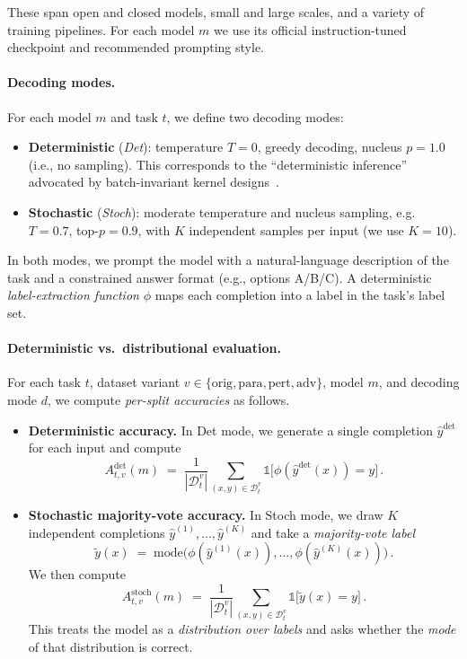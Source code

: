 These span open and closed models, small and large scales, and a variety
of training pipelines. For each model $m$ we use its official
instruction-tuned checkpoint and recommended prompting style.

\paragraph{Decoding modes.}
For each model $m$ and task $t$, we define two decoding modes:

\begin{itemize}[leftmargin=1.5em]
  \item \textbf{Deterministic} (\emph{Det}): temperature $T = 0$,
        greedy decoding, nucleus $p = 1.0$ (i.e., no sampling).
        This corresponds to the ``deterministic inference'' advocated
        by batch-invariant kernel designs~\cite{he2025defeating}.
  \item \textbf{Stochastic} (\emph{Stoch}): moderate temperature
        and nucleus sampling, e.g.\ $T = 0.7$, top-$p = 0.9$,
        with $K$ independent samples per input (we use $K = 10$).
\end{itemize}

In both modes, we prompt the model with a natural-language description
of the task and a constrained answer format (e.g., options A/B/C).
A deterministic \emph{label-extraction function} $\phi$ maps each
completion into a label in the task's label set.

\paragraph{Deterministic vs.~distributional evaluation.}
For each task $t$, dataset variant $v \in \{\text{orig},\text{para},
\text{pert},\text{adv}\}$, model $m$, and decoding mode $d$, we compute
\emph{per-split accuracies} as follows.

\begin{itemize}[leftmargin=1.5em]
  \item \textbf{Deterministic accuracy.} In Det mode, we generate a
        single completion $\hat{y}^{\text{det}}$ for each input and
        compute
        \[
          A_{t,v}^{\text{det}}(m)
          \;=\;
          \frac{1}{|\mathcal{D}_t^{v}|}
          \sum_{(x,y) \in \mathcal{D}_t^{v}}
          \mathbb{1}\!\bigl[\phi(\hat{y}^{\text{det}}(x)) = y\bigr]\,.
        \]
  \item \textbf{Stochastic majority-vote accuracy.} In Stoch mode,
        we draw $K$ independent completions
        $\hat{y}^{(1)}, \dots, \hat{y}^{(K)}$ and take a
        \emph{majority-vote label}
        \[
          \tilde{y}(x) \;=\;
          \text{mode}\bigl(\phi(\hat{y}^{(1)}(x)), \dots,
                           \phi(\hat{y}^{(K)}(x))\bigr)\,.
        \]
        We then compute
        \[
          A_{t,v}^{\text{stoch}}(m)
          \;=\;
          \frac{1}{|\mathcal{D}_t^{v}|}
          \sum_{(x,y) \in \mathcal{D}_t^{v}}
          \mathbb{1}\!\bigl[\tilde{y}(x) = y\bigr]\,.
        \]
        This treats the model as a \emph{distribution over labels} and
        asks whether the \emph{mode} of that distribution is correct.
\end{itemize}

